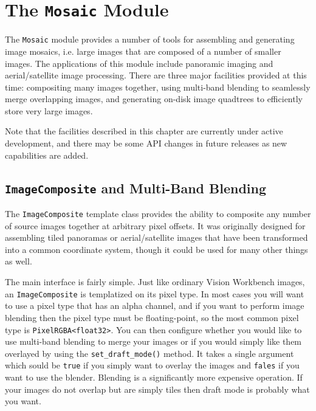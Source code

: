 \chapter{The {\tt Mosaic} Module}\label{ch:mosaic-module}

The \verb#Mosaic# module provides a number of tools for assembling and
generating image mosaics, i.e. large images that are composed of a
number of smaller images.  The applications of this module include
panoramic imaging and aerial/satellite image processing.  There are 
three major facilities provided at this time: compositing many images 
together, using multi-band blending to seamlessly merge overlapping 
images, and generating on-disk image quadtrees to efficiently store 
very large images.

Note that the facilities described in this chapter are currently under
active development, and there may be some API changes in future
releases as new capabilities are added.

\section{{\tt ImageComposite} and Multi-Band Blending}\label{sec:imagecomposite}

The \verb#ImageComposite# template class provides the ability to
composite any number of source images together at arbitrary pixel
offsets.  It was originally designed for assembling tiled panoramas or
aerial/satellite images that have been transformed into a common
coordinate system, though it could be used for many other things as
well.

The main interface is fairly simple.  Just like ordinary Vision
Workbench images, an \verb#ImageComposite# is templatized on its pixel
type.  In most cases you will want to use a pixel type that has an
alpha channel, and if you want to perform image blending then the
pixel type must be floating-point, so the most common pixel type is
\verb#PixelRGBA<float32>#.  You can then configure whether you would 
like to use multi-band blending to merge your images or if you would 
simply like them overlayed by using the \verb#set_draft_mode()# 
method.  It takes a single argument which sould be \verb#true# if 
you simply want to overlay the images and \verb#fales# if you want 
to use the blender.  Blending is a significantly more expensive 
operation.  If your images do not overlap but are simply tiles then 
draft mode is probably what you want. 

